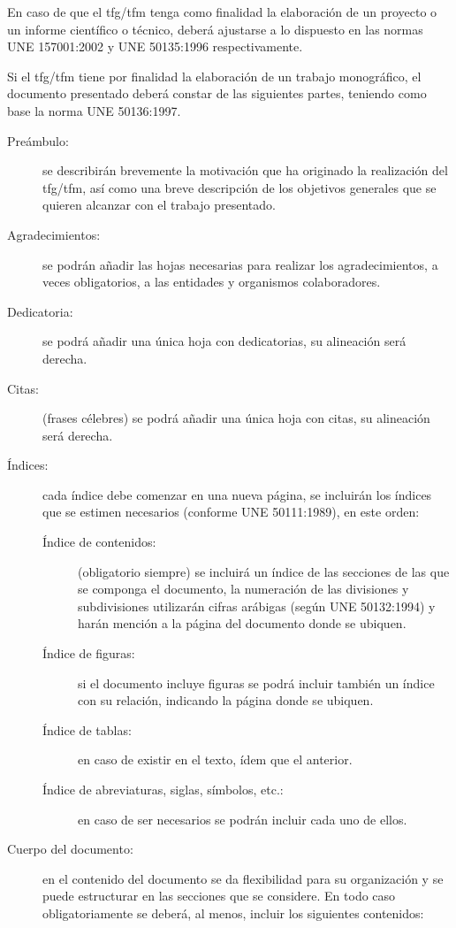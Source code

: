 En caso de que el \gls{tfg}/\gls{tfm} tenga como finalidad la elaboración de un proyecto o un 
informe científico o técnico, deberá ajustarse a lo dispuesto en las normas UNE 
157001:2002 y UNE 50135:1996 respectivamente.

Si el \gls{tfg}/\gls{tfm} tiene por finalidad la elaboración de un trabajo monográfico, el 
documento presentado deberá constar de las siguientes partes, teniendo como base la 
norma UNE 50136:1997.

\begin{description}
\item[Preámbulo:] se describirán brevemente la motivación que ha originado la realización del \gls{tfg}/\gls{tfm}, así como una breve descripción de los objetivos generales que se quieren alcanzar con el trabajo presentado.
\item[Agradecimientos:] se podrán añadir las hojas necesarias para realizar los agradecimientos, a veces obligatorios, a las entidades y organismos colaboradores.
\item[Dedicatoria:] se podrá añadir una única hoja con dedicatorias, su alineación será derecha.
\item[Citas:] (frases célebres) se podrá añadir una única hoja con citas, su alineación será derecha.
\item[Índices:] cada índice debe comenzar en una nueva página, se incluirán los índices que se estimen necesarios (conforme UNE 50111:1989), en este orden:
\begin{description}
\item[Índice de contenidos:] (obligatorio siempre) se incluirá un índice de las secciones de las que se componga el documento, la numeración de las 
divisiones y subdivisiones utilizarán cifras arábigas (según UNE 50132:1994) y harán mención a la página del documento donde se ubiquen.
\item[Índice de figuras:] si el documento incluye figuras se podrá incluir también un índice con su relación, indicando la página donde se ubiquen.
\item[Índice de tablas:] en caso de existir en el texto, ídem que el anterior.
\item[Índice de abreviaturas, siglas, símbolos, etc.:] en caso de ser necesarios se podrán incluir cada uno de ellos.
\end{description}
\item[Cuerpo del documento:] en el contenido del documento se da flexibilidad para su organización y se puede estructurar en las secciones que se considere. En todo caso obligatoriamente se deberá, al menos, incluir los siguientes contenidos:

\end{description}
